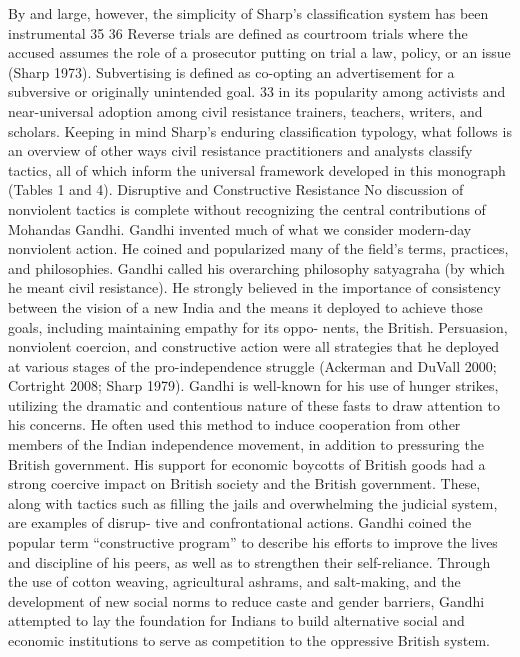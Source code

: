 \documentclass[twoside,a4paper,12pt,fleqn,openany]{extbook}
\begin{document}
By and large, however, the simplicity of Sharp’s classification system has been instrumental
35
36
Reverse trials are defined as courtroom trials where the accused assumes the role of a prosecutor putting on trial
a law, policy, or an issue (Sharp 1973).
Subvertising is defined as co-opting an advertisement for a subversive or originally unintended goal.
33
in its popularity among activists and near-universal adoption among civil resistance trainers,
teachers, writers, and scholars.
Keeping in mind Sharp’s enduring classification typology, what follows is an overview of
other ways civil resistance practitioners and analysts classify tactics, all of which inform the
universal framework developed in this monograph (Tables 1 and 4).
Disruptive and Constructive Resistance
No discussion of nonviolent tactics is complete without recognizing the central contributions
of Mohandas Gandhi. Gandhi invented much of what we consider modern-day nonviolent
action. He coined and popularized many of the field’s terms, practices, and philosophies.
Gandhi called his overarching philosophy satyagraha (by which he meant civil resistance).
He strongly believed in the importance of consistency between the vision of a new India and
the means it deployed to achieve those goals, including maintaining empathy for its oppo-
nents, the British. Persuasion, nonviolent coercion, and constructive action were all strategies
that he deployed at various stages of the pro-independence struggle (Ackerman and DuVall
2000; Cortright 2008; Sharp 1979).
Gandhi is well-known for his use of hunger strikes, utilizing the dramatic and contentious
nature of these fasts to draw attention to his concerns. He often used this method to induce
cooperation from other members of the Indian independence movement, in addition to
pressuring the British government. His support for economic boycotts of British goods had
a strong coercive impact on British society and the British government. These, along with
tactics such as filling the jails and overwhelming the judicial system, are examples of disrup-
tive and confrontational actions.
Gandhi coined the popular term “constructive program” to describe his efforts to improve
the lives and discipline of his peers, as well as to strengthen their self-reliance. Through the
use of cotton weaving, agricultural ashrams, and salt-making, and the development of new
social norms to reduce caste and gender barriers, Gandhi attempted to lay the foundation
for Indians to build alternative social and economic institutions to serve as competition to the
oppressive British system.
\end{document}
